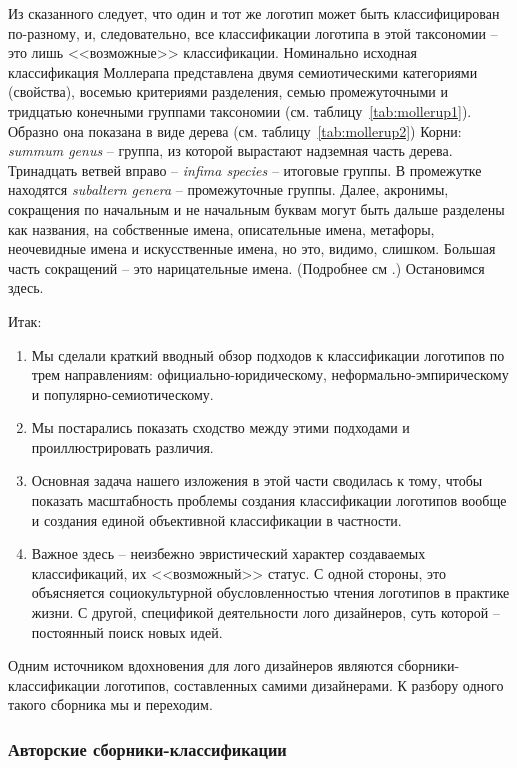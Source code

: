 Из сказанного следует, что один и тот же логотип может быть классифицирован по-разному, и,
следовательно, все классификации логотипа в этой таксономии -- это лишь <<возможные>>
классификации. Номинально исходная классификация Моллерапа представлена двумя семиотическими
категориями (свойства), восемью критериями разделения, семью промежуточными и тридцатью конечными
группами таксономии (см. таблицу~\ref{tab:mollerup1}). Образно она показана в виде дерева
(см. таблицу~\ref{tab:mollerup2}) Корни: \emph{summum genus} -- группа, из которой вырастают надземная
часть дерева. Тринадцать ветвей вправо -- \emph{infima species} -- итоговые группы. В промежутке
находятся \emph{subaltern genera} -- промежуточные группы. Далее, акронимы, сокращения по начальным
и не начальным буквам могут быть дальше разделены как названия, на собственные имена, описательные
имена, метафоры, неочевидные имена и искусственные имена, но это, видимо, слишком. Большая часть
сокращений -- это нарицательные имена. (Подробнее см \autocite[][98-123]{mollerup1999marks}.)
Остановимся здесь.

Итак:
\begin{enumerate}
\item Мы сделали краткий вводный обзор подходов к классификации логотипов по трем направлениям:
  официально-юридическому, неформально-эмпирическому и популярно-семиотическому.
\item Мы постарались показать сходство между этими подходами и проиллюстрировать различия.
\item Основная задача нашего изложения в этой части сводилась к тому, чтобы показать масштабность
  проблемы создания классификации логотипов вообще и создания единой объективной классификации в
  частности.
\item Важное здесь -- неизбежно эвристический характер создаваемых классификаций, их <<возможный>>
  статус. С одной стороны, это объясняется социокультурной обусловленностью чтения логотипов в
  практике жизни. С другой, спецификой деятельности лого дизайнеров, суть которой -- постоянный поиск
  новых идей.
\end{enumerate}

Одним источником вдохновения для лого дизайнеров являются сборники-классификации логотипов,
составленных самими дизайнерами. К разбору одного такого сборника мы и переходим.

\subsubsection{Авторские сборники-классификации}
\label{2.2}

